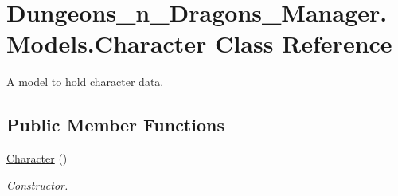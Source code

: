 \hypertarget{class_dungeons__n___dragons___manager_1_1_models_1_1_character}{}\section{Dungeons\+\_\+n\+\_\+\+Dragons\+\_\+\+Manager.\+Models.\+Character Class Reference}
\label{class_dungeons__n___dragons___manager_1_1_models_1_1_character}


A model to hold character data.  


\subsection*{Public Member Functions}
\begin{DoxyCompactItemize}
\item 
\mbox{\hyperlink{class_dungeons__n___dragons___manager_1_1_models_1_1_character_a3e254d05700623802d3320e00f8edbd3}{Character}} ()
\begin{DoxyCompactList}\small\item\em Constructor. \end{DoxyCompactList}\end{DoxyCompactItemize}

